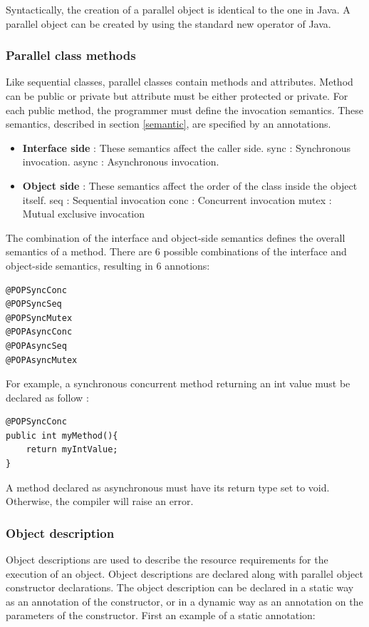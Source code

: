 Syntactically, the creation of a parallel object is identical to the one in Java. A parallel object can be created by using the standard new operator of Java.


\subsubsection{Parallel class methods}
Like sequential classes, parallel classes contain methods and attributes.
Method can be public or private but attribute must be either protected or private.
For each public method, the programmer must define the invocation semantics.
These semantics, described in section \ref{semantic}, are specified by an annotations.

\begin{itemize}
\item \textbf{Interface side} : These semantics affect the caller side.
\subitem sync : Synchronous invocation. 
\subitem async : Asynchronous invocation.
\item \textbf{Object side} : These semantics affect the order of the class inside the object itself.
\subitem seq : Sequential invocation
\subitem conc : Concurrent invocation
\subitem mutex : Mutual exclusive invocation
\end{itemize}

The combination of the interface and object-side semantics defines the overall semantics of a method. There
are 6 possible combinations of the interface and object-side semantics, resulting in 6 annotions:

\begin{lstlisting}
@POPSyncConc
@POPSyncSeq
@POPSyncMutex
@POPAsyncConc
@POPAsyncSeq
@POPAsyncMutex
\end{lstlisting}
\pagebreak
For example, a synchronous concurrent method returning an int value must be declared as follow : 
\begin{lstlisting}
@POPSyncConc
public int myMethod(){
	return myIntValue;
}
\end{lstlisting}

A method declared as asynchronous must have its return type set to void. Otherwise, the compiler will raise an error.


\subsubsection{Object description}
\label{dev:objdesc}
Object descriptions are used to describe the resource requirements for the execution of an object.
Object descriptions are declared along with parallel object constructor declarations.
The object description can be declared in a static way as an annotation of the constructor, or in a dynamic way
as an annotation on the parameters of the constructor. First an example of a static annotation:


